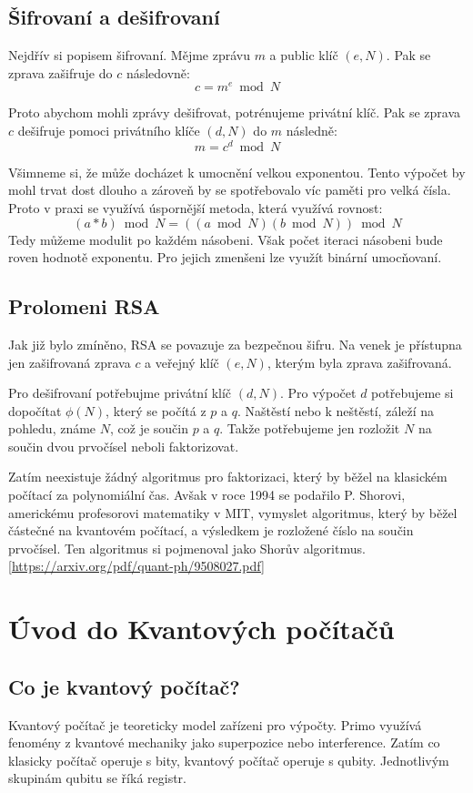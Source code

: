 \documentclass[11pt]{article}
\begin{document}
\subsection{Šifrovaní a dešifrovaní}
Nejdřív si popisem šifrovaní.
Mějme zprávu $m$ a public klíč $(e, N)$.
Pak se zprava zašifruje do $c$ následovně:
$$c = m^e \bmod N$$
\par Proto abychom mohli zprávy dešifrovat, potrénujeme privátní klíč.
Pak se zprava $c$ dešifruje pomoci privátního klíče $(d, N)$ do $m$ následně:
$$m = c^d \bmod N$$
\par Všimneme si, že může docházet k umocnění velkou exponentou.
Tento výpočet by mohl trvat dost dlouho a zároveň by se spotřebovalo víc paměti pro velká čísla.
Proto v praxi se využívá úspornější metoda, která využívá rovnost:
$$(a * b) \bmod N = ((a \bmod N)(b \bmod N)) \bmod N$$
Tedy můžeme modulit po každém násobeni.
Však počet iteraci násobeni bude roven hodnotě exponentu.
Pro jejich zmenšeni lze využít binární umocňovaní.

\subsection{Prolomeni RSA}
Jak již bylo zmíněno, RSA se povazuje za bezpečnou šifru.
Na venek je přístupna jen zašifrovaná zprava $c$ a veřejný klíč $(e, N)$, kterým byla zprava zašifrovaná.

\par Pro dešifrovaní potřebujme privátní klíč $(d, N)$.
Pro výpočet $d$ potřebujeme si dopočítat $\phi (N)$, který se počítá z $p$ a $q$.
Naštěstí nebo k neštěstí, záleží na pohledu, známe $N$, což je součin $p$ a $q$.
Takže potřebujeme jen rozložit $N$ na součin dvou prvočísel neboli faktorizovat.

\par Zatím neexistuje žádný algoritmus pro faktorizaci, který by běžel na klasickém počítací za polynomiální čas.
Avšak v roce 1994 se podařilo P. Shorovi, americkému profesorovi matematiky v MIT, vymyslet algoritmus, který by běžel částečné na kvantovém počítací, a výsledkem je rozložené číslo na součin prvočísel.
Ten algoritmus si pojmenoval jako Shorův algoritmus.[\url{https://arxiv.org/pdf/quant-ph/9508027.pdf}]

\newpage

\section{Úvod do Kvantových počítačů}
\subsection{Co je kvantový počítač?}
Kvantový počítač je teoreticky model zařízeni pro výpočty.
Primo využívá fenomény z kvantové mechaniky jako superpozice nebo interference.
Zatím co klasicky počítač operuje s bity, kvantový počítač operuje s qubity.
Jednotlivým skupinám qubitu se říká registr.
\end{document}
